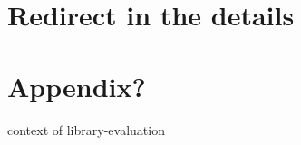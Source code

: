 



\section{Redirect in the details}

\section{Appendix?}
\begin{bnf}
  {context of library-evaluation}\\           {}%
\end{bnf}




